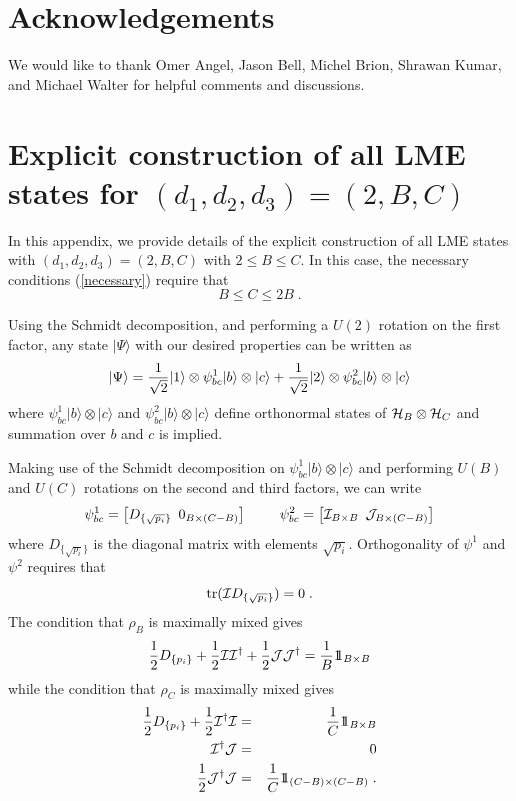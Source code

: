 \documentclass[12pt]{article}
\theoremstyle{definition}
\newcommand{\be}{\begin{equation}}
\newcommand{\ee}{\end{equation}}
\newcommand{\bea}{\begin{eqnarray}}
\newcommand{\eea}{\end{eqnarray}}
\def\identity{{\rlap{1} \hskip 1.6pt \hbox{1}}}
\newcommand{\tr}{{\rm tr}}
\begin{document}
\section*{Acknowledgements}

We would like to thank Omer Angel, Jason Bell, Michel Brion, Shrawan Kumar, and Michael Walter for helpful comments and discussions.

\appendix

\section{Explicit construction of all LME states for $(d_1,d_2,d_3) = (2,B,C)$}

In this appendix, we provide details of the explicit construction of all LME states with $(d_1, d_2, d_3) = (2,B,C)$ with $2 \le B \le C$. In this case, the necessary conditions (\ref{necessary}) require that
\be
B \le C \le 2 B \; .
\ee

Using the Schmidt decomposition, and performing a $U(2)$ rotation on the first factor, any state $|\Psi \rangle$ with our desired properties can be written as
\be
|\Psi \rangle = {1 \over \sqrt{2}} | 1 \rangle  \otimes \psi^1_{bc} |b\rangle  \otimes |c \rangle + {1 \over \sqrt{2}} | 2 \rangle  \otimes \psi^2_{bc} |b\rangle  \otimes |c \rangle
\ee
where $\psi^1_{bc} |b\rangle  \otimes |c \rangle$ and $\psi^2_{bc} |b\rangle  \otimes |c \rangle$ define orthonormal states of ${\cal H}_B  \otimes {\cal H}_C$ and summation over $b$ and $c$ is implied.

Making use of the Schmidt decomposition on $\psi^1_{bc} |b\rangle  \otimes |c \rangle$ and performing $U(B)$ and $U(C)$ rotations on the second and third factors, we can write
\be
\psi^1_{bc} = {\large \left[D_{\{\sqrt{p_i}\}} \, \, \,  0_{B \times (C-B)} \right] \qquad
\psi^2_{bc} = \left[{\cal I}_{B \times B} \, \, \, {\cal J}_{B \times (C-B)} \right]}
\ee
where $D_{\{\sqrt{p_i}\}}$ is the diagonal matrix with elements $\sqrt{p_i}$. Orthogonality of $\psi^1$ and $\psi^2$ requires that
\be
\label{cond1}
\tr({\cal I}D_{\{ \sqrt{p_i} \}}) = 0 \; .
\ee
The condition that $\rho_B$ is maximally mixed gives
\be
\label{cond2}
{1 \over 2} D_{\{p_i\}} + {1 \over 2} {\cal I} {\cal I}^\dagger + {1 \over 2} {\cal J} {\cal J}^\dagger = {1 \over B} \identity_{B \times B}
\ee
while the condition that $\rho_C$ is maximally mixed gives
\bea
\label{cond3}
{1 \over 2} D_{\{p_i\}} + {1 \over 2} {\cal I}^\dagger {\cal I}  &=& {1 \over C} \identity_{B \times B} \\
\label{cond4}
{\cal I}^\dagger {\cal J} &=& 0 \\
{1 \over 2} {\cal J}^\dagger {\cal J} &=& {1 \over C} \identity_{(C-B) \times (C-B)} \; .
\label{cond5}
\eea
\end{document}

